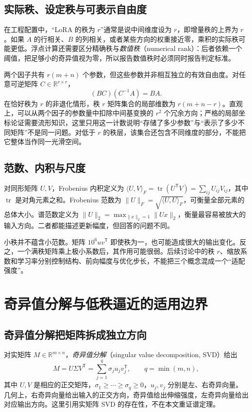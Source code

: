 \documentclass[UTF8,12pt,a4paper,fontset=fandol]{ctexart}
\begin{document}
\subsection{实际秩、设定秩与可表示自由度}

在工程配置中，“LoRA 的秩为 $r$”通常是说中间维度设为 $r$，即增量秩的上界为 $r$。如果 $A$ 的行相关、$B$ 的列相关，或者某些方向的权重接近零，乘积的实际秩可能更低。浮点计算还需要区分精确秩与\emph{数值秩}（numerical rank）：后者依赖一个阈值，把足够小的奇异值视为零，所以报告数值秩时必须同时报告判定标准。

两个因子共有 $r(m+n)$ 个参数，但这些参数并非相互独立的有效自由度。对任意可逆矩阵 $C\in\mathbb R^{r\times r}$，
\[
(BC)(C^{-1}A)=BA.
\]
在恰好秩为 $r$ 的非退化情形，秩 $r$ 矩阵集合的局部维数为 $r(m+n-r)$。直观上，可以从两个因子的参数量中扣除中间基变换的 $r^2$ 个冗余方向；严格的局部坐标论证需要流形知识，这里只用这一计数说明“存储了多少参数”与“表示了多少不同矩阵”不是同一问题。对低于 $r$ 的秩层，该集合还包含不同维度的部分，不能把它整体当作同一光滑空间。

\subsection{范数、内积与尺度}

对同形矩阵 $U,V$，Frobenius 内积定义为
$\langle U,V\rangle_F=\operatorname{tr}(U^{\mathsf T}V)=\sum_{ij}U_{ij}V_{ij}$，其中 $\operatorname{tr}$ 是对角元素之和。Frobenius 范数为 $\|U\|_F=\sqrt{\langle U,U\rangle_F}$，可衡量全部元素的总体大小。谱范数定义为
$\|U\|_2=\max_{\|x\|_2=1}\|Ux\|_2$，衡量最容易被放大的输入方向。二者都能描述更新幅度，但回答的问题不同。

小秩并不蕴含小范数。矩阵 $10^6uv^{\mathsf T}$ 即使秩为一，也可能造成很大的输出变化。反之，一个满秩矩阵乘上极小系数后，其作用可能很弱。后续讨论中的秩 $r$、缩放系数和学习率分别控制结构、前向幅度与优化步长，不能把三个概念混成一个“适配强度”。

\section{奇异值分解与低秩逼近的适用边界}
\label{sec:svd}

\subsection{奇异值分解把矩阵拆成独立方向}

对实矩阵 $M\in\mathbb R^{m\times n}$，\emph{奇异值分解}（singular value decomposition, SVD）给出
\[
M=U\Sigma V^{\mathsf T}
=\sum_{j=1}^{q}\sigma_ju_jv_j^{\mathsf T},
\qquad q=\min(m,n),
\]
其中 $U,V$ 是相应的正交矩阵，$\sigma_1\geq\cdots\geq\sigma_q\geq0$，$u_j,v_j$ 分别是左、右奇异向量。几何上，右奇异向量给出输入的正交方向，奇异值给出伸缩强度，左奇异向量给出对应输出方向。这里引用实矩阵 SVD 的存在性，不在本文重证谱定理。
\end{document}
